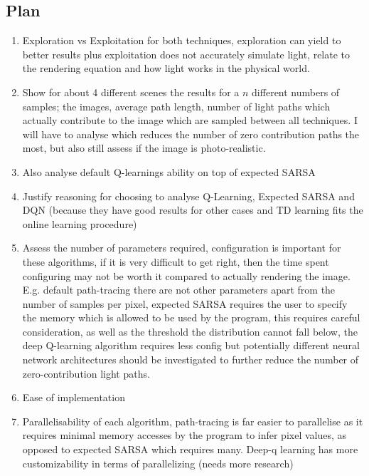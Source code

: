 \documentclass[ %
                    author={Callum Pearce},
                supervisor={Dr. Neill Campbell},
                    degree={MEng},
                     title={How effective are Temporal difference learning methods in reducing the number of zero contribution light paths in Path tracing?},
                  subtitle={},
                      type={research},
                      year={2019} ]{dissertation}
\begin{document}
\subsection{Plan}
\begin{enumerate}
\item Exploration vs Exploitation for both techniques, exploration can yield to better results plus exploitation does not accurately simulate light, relate to the rendering equation and how light works in the physical world.

\item Show for about 4 different scenes the results for a $n$ different numbers of samples; the images, average path length, number of light paths which actually contribute to the image which are sampled between all techniques. I will have to analyse which reduces the number of zero contribution paths the most, but also still assess if the image is photo-realistic.

\item Also analyse default Q-learnings ability on top of expected SARSA

\item Justify reasoning for choosing to analyse Q-Learning, Expected SARSA and DQN (because they have good results for other cases and TD learning fits the online learning procedure)

\item Assess the number of parameters required, configuration is important for these algorithms, if it is very difficult to get right, then the time spent configuring may not be worth it compared to actually rendering the image. E.g. default path-tracing there are not other parameters apart from the number of samples per pixel, expected SARSA requires the user to specify the memory which is allowed to be used by the program, this requires careful consideration, as well as the threshold the distribution cannot fall below, the deep Q-learning algorithm requires less config but potentially different neural network architectures should be investigated to further reduce the number of zero-contribution light paths. 

\item Ease of implementation 

\item Parallelisability of each algorithm, path-tracing is far easier to parallelise as it requires minimal memory accesses by the program to infer pixel values, as opposed to expected SARSA which requires many. Deep-q learning has more customizability in terms of parallelizing (needs more research)


\end{enumerate}
\end{document}

